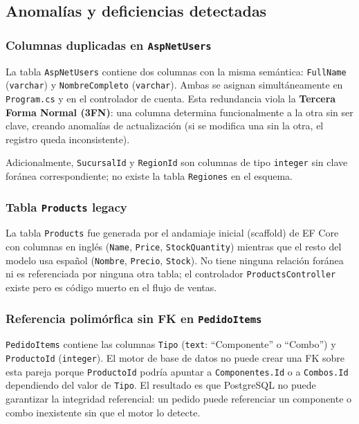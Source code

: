 \subsection{Anomalías y deficiencias detectadas}

\subsubsection{Columnas duplicadas en \texttt{AspNetUsers}}

La tabla \texttt{AspNetUsers} contiene dos columnas con la misma semántica:
\texttt{FullName} (\texttt{varchar}) y \texttt{NombreCompleto} (\texttt{varchar}).
Ambas se asignan simultáneamente en \texttt{Program.cs} y en el controlador de cuenta.
Esta redundancia viola la \textbf{Tercera Forma Normal (3FN)}: una columna determina funcionalmente a la otra sin ser clave, creando anomalías de actualización (si se modifica una sin la otra, el registro queda inconsistente).

Adicionalmente, \texttt{SucursalId} y \texttt{RegionId} son columnas de tipo \texttt{integer} sin clave foránea correspondiente; no existe la tabla \texttt{Regiones} en el esquema.

\subsubsection{Tabla \texttt{Products} legacy}

La tabla \texttt{Products} fue generada por el andamiaje inicial (scaffold) de EF Core con columnas en inglés (\texttt{Name}, \texttt{Price}, \texttt{StockQuantity}) mientras que el resto del modelo usa español (\texttt{Nombre}, \texttt{Precio}, \texttt{Stock}).
No tiene ninguna relación foránea ni es referenciada por ninguna otra tabla; el controlador \texttt{ProductsController} existe pero es código muerto en el flujo de ventas.

\subsubsection{Referencia polimórfica sin FK en \texttt{PedidoItems}}

\texttt{PedidoItems} contiene las columnas \texttt{Tipo} (\texttt{text}: ``Componente'' o ``Combo'') y \texttt{ProductoId} (\texttt{integer}).
El motor de base de datos no puede crear una FK sobre esta pareja porque \texttt{ProductoId} podría apuntar a \texttt{Componentes.Id} o a \texttt{Combos.Id} dependiendo del valor de \texttt{Tipo}.
El resultado es que PostgreSQL no puede garantizar la integridad referencial: un pedido puede referenciar un componente o combo inexistente sin que el motor lo detecte.

